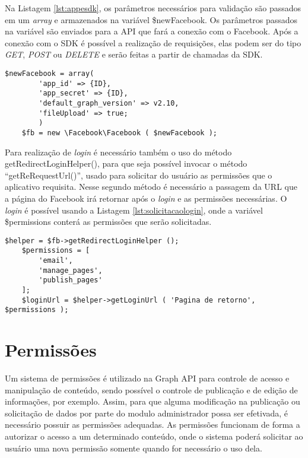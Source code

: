 Na Listagem \ref{lst:appesdk}, os parâmetros necessários para validação são passados em um \textit{array} e armazenados na variável \$newFacebook. Os parâmetros passados na variável são enviados para a API que fará a conexão com o Facebook. Após a conexão com o SDK é possível a realização de requisições, elas podem ser do tipo \textit{GET}, \textit{POST} ou \textit{DELETE} e serão feitas a partir de chamadas da SDK.

\begin{lstlisting}[caption={Conexão entre aplicativo e SDK},label={lst:appesdk}]
	$newFacebook = array(
		'app_id' => {ID},
		'app_secret' => {ID},
		'default_graph_version' => v2.10,
		'fileUpload' => true;
		)
	$fb = new \Facebook\Facebook ( $newFacebook );
\end{lstlisting}

Para realização de \textit{login} é necessário também o uso do método getRedirectLoginHelper(), para que seja possível invocar o método ``getReRequestUrl()'', usado para solicitar do usuário as permissões que o aplicativo requisita. Nesse segundo método é necessário a passagem da URL que a página do Facebook irá retornar após o \textit{login} e as permissões necessárias. O \textit{login} é possível usando a Listagem \ref{lst:solicitacaologin}, onde a variável \$permissions conterá as permissões que serão solicitadas.

\begin{lstlisting}[caption={Solicitação de Login},label={lst:solicitacaologin}]
	$helper = $fb->getRedirectLoginHelper ();
	$permissions = [
		'email',
		'manage_pages',
		'publish_pages'
	];
	$loginUrl = $helper->getLoginUrl ( 'Pagina de retorno', $permissions );
\end{lstlisting}

\section{Permissões}
\label{sec:permissoes}
Um sistema de permissões é utilizado na Graph API para controle de acesso e manipulação de conteúdo, sendo possível o controle de publicação e de edição de informações, por exemplo. Assim, para que alguma modificação na publicação ou solicitação de dados por parte do modulo administrador possa ser efetivada, é necessário possuir as permissões adequadas. As permissões funcionam de forma a autorizar o acesso a um determinado conteúdo, onde o sistema poderá solicitar ao usuário uma nova permissão somente quando for necessário o uso dela.

